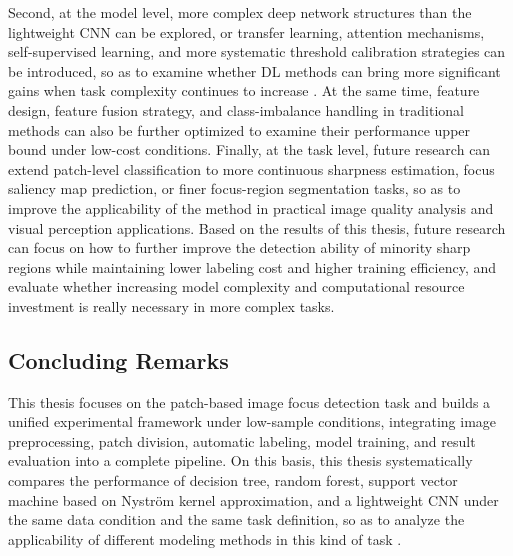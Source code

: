 \par Second, at the model level, more complex deep network structures than the
lightweight CNN can be explored, or transfer learning, attention mechanisms,
self-supervised learning, and more systematic threshold calibration strategies
can be introduced, so as to examine whether DL methods can bring more
significant gains when task complexity continues to increase
\cite{shorten2019survey,sohn2020fixmatch,davis2006relationship}. At the same time,
feature design, feature fusion strategy, and class-imbalance handling in
traditional methods can also be further optimized to examine their performance
upper bound under low-cost conditions. Finally, at the task level, future
research can extend patch-level classification to more continuous sharpness
estimation, focus saliency map prediction, or finer focus-region segmentation
tasks, so as to improve the applicability of the method in practical image
quality analysis and visual perception applications. Based on the results of
this thesis, future research can focus on how to further improve the detection
ability of minority sharp regions while maintaining lower labeling cost and
higher training efficiency, and evaluate whether increasing model complexity and
computational resource investment is really necessary in more complex tasks.

\subsection{Concluding Remarks}
\par This thesis focuses on the patch-based image focus detection task
\cite{Hou_2016_CVPR} and builds a unified experimental framework under
low-sample conditions, integrating image preprocessing, patch division,
automatic labeling, model training, and result evaluation into a complete
pipeline. On this basis, this thesis systematically compares the performance of
decision tree, random forest, support vector machine based on Nystr\"{o}m kernel
approximation, and a lightweight CNN under the same data condition and the same
task definition, so as to analyze the applicability of different modeling
methods in this kind of task \cite{lecun2002gradient,krizhevsky2012imagenet}.

